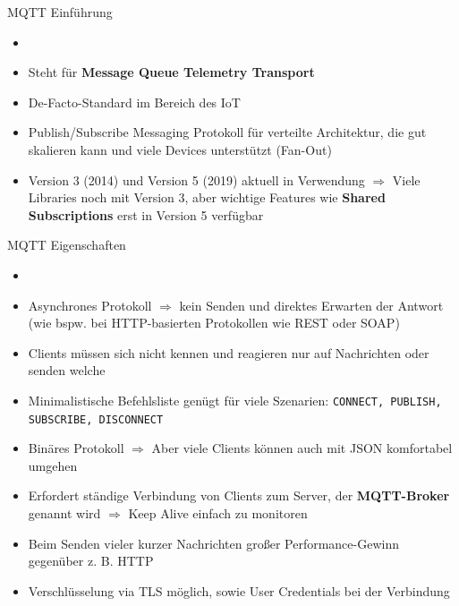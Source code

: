 \begin{frame}{MQTT Einführung}
     \begin{itemize}
        \setlength{\itemindent}{0.4in}
        \item [\textbf{MQTT}]
    \end{itemize}
    \begin{itemize}
        \item Steht für \textbf{Message Queue Telemetry Transport}
        \item De-Facto-Standard im Bereich des IoT
        \item Publish/Subscribe Messaging Protokoll für verteilte Architektur, die gut skalieren kann und viele Devices unterstützt (Fan-Out)
        \item Version 3 (2014) und Version 5 (2019) aktuell in Verwendung $\Rightarrow$ Viele Libraries noch mit Version 3, aber wichtige Features wie \textbf{Shared Subscriptions} erst in Version 5 verfügbar
    \end{itemize}
\end{frame}

\begin{frame}{MQTT Eigenschaften}
         \begin{itemize}
        \setlength{\itemindent}{1.28in}
        \item [\textbf{MQTT Eigenschaften}]
    \end{itemize}
    \begin{itemize}
        \item Asynchrones Protokoll  $\Rightarrow$  kein Senden und direktes Erwarten der Antwort (wie bspw. bei HTTP-basierten Protokollen wie REST oder SOAP)
        \item Clients müssen sich nicht kennen und reagieren nur auf Nachrichten oder senden welche
        \item Minimalistische Befehlsliste genügt für viele Szenarien: \texttt{CONNECT, PUBLISH, SUBSCRIBE,  DISCONNECT}
        \item Binäres Protokoll  $\Rightarrow$  Aber viele Clients können auch mit JSON komfortabel umgehen
        \item Erfordert ständige Verbindung von Clients zum Server, der \textbf{MQTT-Broker} genannt wird $\Rightarrow$ Keep Alive einfach zu monitoren
        \item Beim Senden vieler kurzer Nachrichten großer Performance-Gewinn gegenüber z. B. HTTP
        \item Verschlüsselung via TLS möglich, sowie User Credentials bei der Verbindung
    \end{itemize}
\end{frame}


